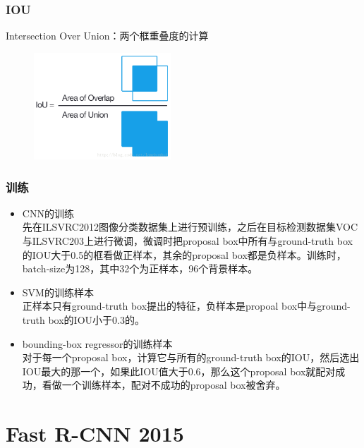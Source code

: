 \documentclass{beamer}
\begin{document}
    \begin{frame}
        \frametitle{IOU}
        Intersection Over Union：两个框重叠度的计算 \\
        \begin{figure}
            \centering
            \includegraphics[height=4cm]{../graphic/iou.png}
        \end{figure}
    \end{frame}
    
    \begin{frame}
        \frametitle{训练}
        \begin{itemize}
            \item CNN的训练 \\
            先在ILSVRC2012图像分类数据集上进行预训练，之后在目标检测数据集VOC与ILSVRC203上进行微调，微调时把proposal box中所有与ground-truth box的IOU大于0.5的框看做正样本，其余的proposal box都是负样本。训练时，batch-size为128，其中32个为正样本，96个背景样本。        
            \item SVM的训练样本 \\
            正样本只有ground-truth box提出的特征，负样本是propoal box中与ground-truth box的IOU小于0.3的。
            \item bounding-box regressor的训练样本   \\
            对于每一个proposal box，计算它与所有的ground-truth box的IOU，然后选出IOU最大的那一个，如果此IOU值大于$0.6$，那么这个proposal box就配对成功，看做一个训练样本，配对不成功的proposal box被舍弃。
        \end{itemize}
    \end{frame}
    
    \section{Fast R-CNN 2015}
    
\end{document}
